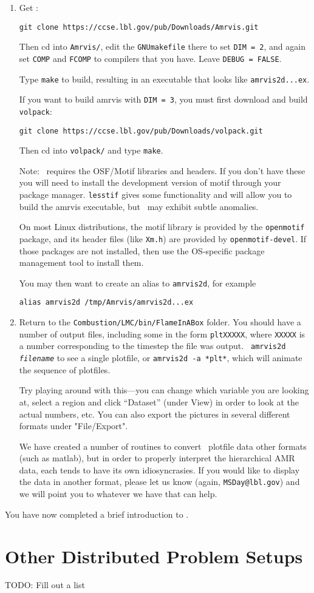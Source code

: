\begin{enumerate}

\item Get \amrvis:
\begin{verbatim}
git clone https://ccse.lbl.gov/pub/Downloads/Amrvis.git
\end{verbatim}

Then cd into {\tt Amrvis/}, edit the {\tt GNUmakefile} there
to set {\tt DIM = 2}, and again set {\tt COMP} and {\tt FCOMP} to compilers that
you have. Leave {\tt DEBUG = FALSE}.

Type {\tt make} to build, resulting in an executable that
looks like {\tt amrvis2d...ex}.

If you want to build amrvis with {\tt DIM = 3}, you must first
download and build {\tt volpack}:
\begin{verbatim}
git clone https://ccse.lbl.gov/pub/Downloads/volpack.git
\end{verbatim}

Then cd into {\tt volpack/} and type {\tt make}.

Note: \amrvis\ requires the OSF/Motif libraries and headers. If you don't have these 
you will need to install the development version of motif through your package manager. 
{\tt lesstif} gives some functionality and will allow you to build the amrvis executable, 
but \amrvis\ may exhibit subtle anomalies.

On most Linux distributions, the motif library is provided by the
{\tt openmotif} package, and its header files (like {\tt Xm.h}) are provided
by {\tt openmotif-devel}. If those packages are not installed, then use the
OS-specific package management tool to install them. 

You may then want to create an alias to {\tt amrvis2d}, for example
\begin{verbatim}
alias amrvis2d /tmp/Amrvis/amrvis2d...ex
\end{verbatim}

\item Return to the {\tt Combustion/LMC/bin/FlameInABox} folder.  You should
  have a number of output files, including some in the form {\tt *pltXXXXX},
  where {\tt XXXXX} is a number corresponding to the timestep the file
  was output.  {\tt
    amrvis2d {\em filename}} to see a single plotfile, or {\tt amrvis2d -a
  *plt*}, which will animate the sequence of plotfiles.

  Try playing
  around with this---you can change which variable you are
  looking at, select a region and click ``Dataset'' (under View)
  in order to look at the actual numbers, etc. You can also export the
  pictures in several different formats under "File/Export".

We have created a number of routines to convert \boxlib\ plotfile data
other formats (such as matlab), but in order to properly interpret 
the hierarchical AMR data, each tends to have its own idiosyncrasies.
If you would like to display the data in another format, please let us know
(again, {\tt MSDay@lbl.gov}) and we will point you to whatever we have
that can help.

\end{enumerate}

You have now completed a brief introduction to \lmc. 


\section{Other Distributed Problem Setups}

TODO: Fill out a list
